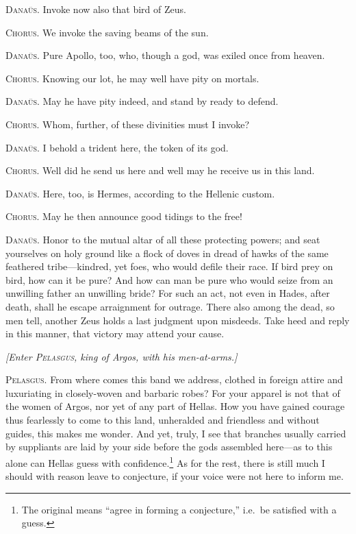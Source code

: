 \documentclass[12pt]{article}
\begin{document}
\textsc{Dana\"{u}s.} Invoke now also that bird of Zeus.

\textsc{Chorus.} We invoke the saving beams of the sun.

\textsc{Dana\"{u}s.} Pure Apollo, too, who, though a god, was exiled once from heaven.

\textsc{Chorus.} Knowing our lot, he may well have pity on mortals.

\textsc{Dana\"{u}s.} May he have pity indeed, and stand by ready to defend.

\textsc{Chorus.} Whom, further, of these divinities must I invoke?

\textsc{Dana\"{u}s.} I behold a trident here, the token of its god.

\textsc{Chorus.} Well did he send us here and well may he receive us in this land.

\textsc{Dana\"{u}s.} Here, too, is Hermes, according to the Hellenic custom.

\textsc{Chorus.} May he then announce good tidings to the free!

\textsc{Dana\"{u}s.} Honor to the mutual altar of all these protecting powers; and seat yourselves on holy ground like a flock of doves in dread of hawks of the same feathered tribe---kindred, yet foes, who would defile their race. If bird prey on bird, how can it be pure? And how can man be pure who would seize from an unwilling father an unwilling bride? For such an act, not even in Hades, after death, shall he escape arraignment for outrage. There also among the dead, so men tell, another Zeus holds a last judgment upon misdeeds. Take heed and reply in this manner, that victory may attend your cause.

\begin{center}
\textit{[Enter \textsc{Pelasgus}, king of Argos, with his men-at-arms.]}
\end{center}

\textsc{Pelasgus.} From where comes this band we address, clothed in foreign attire and luxuriating in closely-woven and barbaric robes? For your apparel is not that of the women of Argos, nor yet of any part of Hellas. How you have gained courage thus fearlessly to come to this land, unheralded and friendless and without guides, this makes me wonder. And yet, truly, I see that branches usually carried by suppliants are laid by your side before the gods assembled here---as to this alone can Hellas guess with confidence.\footnote{The original means ``agree in forming a conjecture,'' i.e.~be satisfied with a guess.} As for the rest, there is still much I should with reason leave to conjecture, if your voice were not here to inform me.
\end{document}
